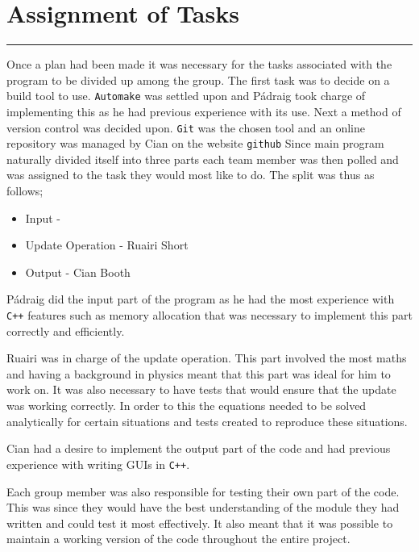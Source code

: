 \section{Assignment of Tasks}
\vspace{-2em}\rule{\textwidth}{1pt}\vspace{1em}

Once a plan had been made it was necessary for the tasks associated with the program to be divided up among the group.
The first task was to decide on a build tool to use.
\texttt{Automake} was settled upon and P\'{a}draig took charge of implementing this as he had previous experience with its use.
Next a method of version control was decided upon.
\texttt{Git} was the chosen tool and an online repository was managed by Cian on the website \texttt{github}
Since main program naturally divided itself into three parts each team member was then polled and was assigned to the task they would most like to do.
The split was thus as follows;
\begin{itemize}
\item Input - \pa
\item Update Operation - Ruairi Short
\item Output - Cian Booth
\end{itemize}

P\'{a}draig did the input part of the program as he had the most experience with \texttt{C++} features such as memory allocation that was necessary to implement this part correctly and efficiently.

Ruairi was in charge of the update operation.
This part involved the most maths and having a background in physics meant that this part was ideal for him to work on.
It was also necessary to have tests that would ensure that the update was working correctly.
In order to this the equations needed to be solved analytically for certain situations and tests created to reproduce these situations.

Cian had a desire to implement the output part of the code and had previous experience with writing GUIs in \texttt{C++}.

Each group member was also responsible for testing their own part of the code.
This was since they would have the best understanding of the module they had written and could test it most effectively.
It also meant that it was possible to maintain a working version of the code throughout the entire project.

